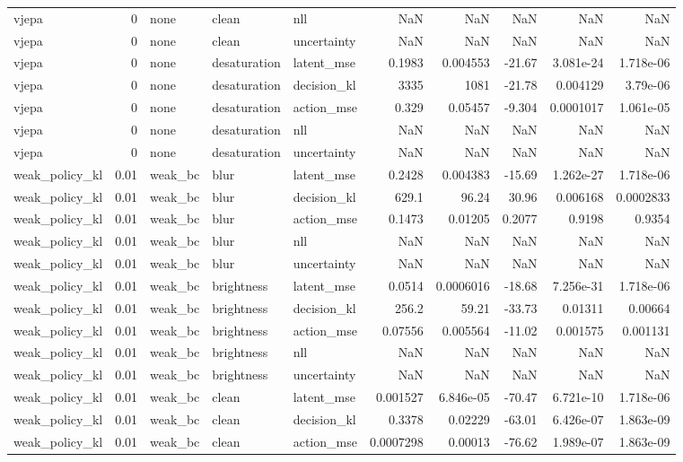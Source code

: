 \begin{tabular}{lrlllrrrrr}
vjepa & 0 & none & clean & nll & NaN & NaN & NaN & NaN & NaN \\
vjepa & 0 & none & clean & uncertainty & NaN & NaN & NaN & NaN & NaN \\
vjepa & 0 & none & desaturation & latent\_mse & 0.1983 & 0.004553 & -21.67 & 3.081e-24 & 1.718e-06 \\
vjepa & 0 & none & desaturation & decision\_kl & 3335 & 1081 & -21.78 & 0.004129 & 3.79e-06 \\
vjepa & 0 & none & desaturation & action\_mse & 0.329 & 0.05457 & -9.304 & 0.0001017 & 1.061e-05 \\
vjepa & 0 & none & desaturation & nll & NaN & NaN & NaN & NaN & NaN \\
vjepa & 0 & none & desaturation & uncertainty & NaN & NaN & NaN & NaN & NaN \\
weak\_policy\_kl & 0.01 & weak\_bc & blur & latent\_mse & 0.2428 & 0.004383 & -15.69 & 1.262e-27 & 1.718e-06 \\
weak\_policy\_kl & 0.01 & weak\_bc & blur & decision\_kl & 629.1 & 96.24 & 30.96 & 0.006168 & 0.0002833 \\
weak\_policy\_kl & 0.01 & weak\_bc & blur & action\_mse & 0.1473 & 0.01205 & 0.2077 & 0.9198 & 0.9354 \\
weak\_policy\_kl & 0.01 & weak\_bc & blur & nll & NaN & NaN & NaN & NaN & NaN \\
weak\_policy\_kl & 0.01 & weak\_bc & blur & uncertainty & NaN & NaN & NaN & NaN & NaN \\
weak\_policy\_kl & 0.01 & weak\_bc & brightness & latent\_mse & 0.0514 & 0.0006016 & -18.68 & 7.256e-31 & 1.718e-06 \\
weak\_policy\_kl & 0.01 & weak\_bc & brightness & decision\_kl & 256.2 & 59.21 & -33.73 & 0.01311 & 0.00664 \\
weak\_policy\_kl & 0.01 & weak\_bc & brightness & action\_mse & 0.07556 & 0.005564 & -11.02 & 0.001575 & 0.001131 \\
weak\_policy\_kl & 0.01 & weak\_bc & brightness & nll & NaN & NaN & NaN & NaN & NaN \\
weak\_policy\_kl & 0.01 & weak\_bc & brightness & uncertainty & NaN & NaN & NaN & NaN & NaN \\
weak\_policy\_kl & 0.01 & weak\_bc & clean & latent\_mse & 0.001527 & 6.846e-05 & -70.47 & 6.721e-10 & 1.718e-06 \\
weak\_policy\_kl & 0.01 & weak\_bc & clean & decision\_kl & 0.3378 & 0.02229 & -63.01 & 6.426e-07 & 1.863e-09 \\
weak\_policy\_kl & 0.01 & weak\_bc & clean & action\_mse & 0.0007298 & 0.00013 & -76.62 & 1.989e-07 & 1.863e-09 \\

\end{tabular}
